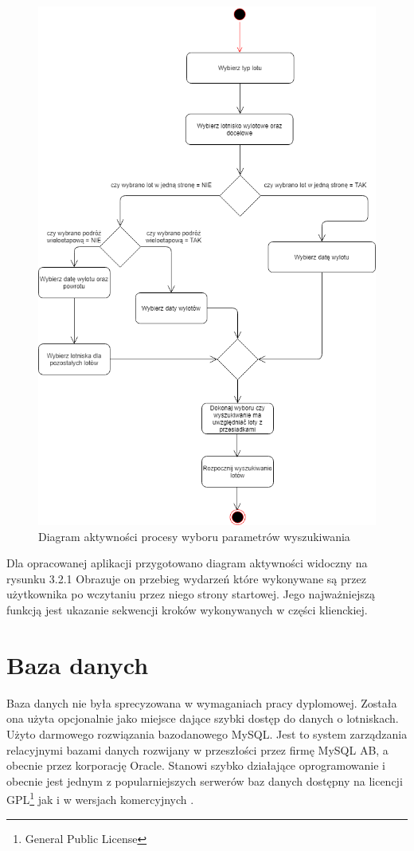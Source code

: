 \documentclass[12pt, twoside]{report}
\begin{document}
\begin{figure}[!ht]
\centering
\includegraphics[scale=0.56, keepaspectratio]{activity_diagram.png}
\caption{Diagram aktywności procesy wyboru parametrów wyszukiwania}
\label{fig:activity_diagram}
\end{figure}
Dla opracowanej aplikacji przygotowano diagram aktywności widoczny na rysunku 3.2.1 Obrazuje on przebieg wydarzeń które wykonywane są przez użytkownika po wczytaniu przez niego strony startowej. Jego najważniejszą funkcją jest ukazanie sekwencji kroków wykonywanych w części klienckiej.
\newpage
\section{Baza danych}
Baza danych nie była sprecyzowana w wymaganiach pracy dyplomowej. Została ona użyta opcjonalnie jako miejsce dające szybki dostęp do danych o lotniskach. Użyto darmowego rozwiązania bazodanowego MySQL. Jest to system zarządzania relacyjnymi bazami danych rozwijany w przeszłości przez firmę MySQL AB, a obecnie przez korporację Oracle. Stanowi szybko działające oprogramowanie i obecnie jest jednym z popularniejszych serwerów baz danych dostępny na licencji GPL\footnote{General Public License} jak i w wersjach komercyjnych \cite{mysql}.
\end{document}
